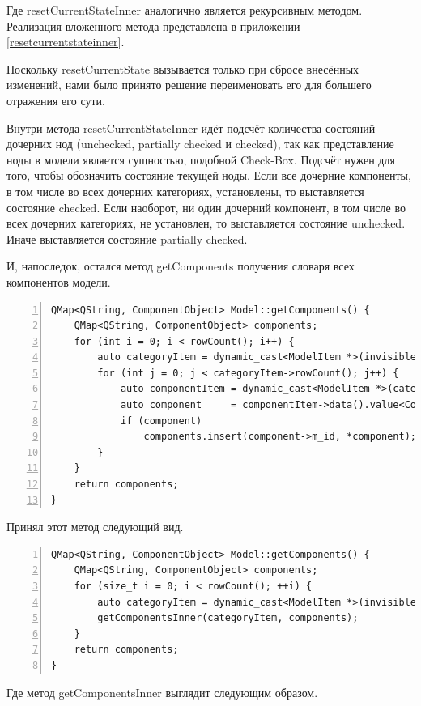 \documentclass[bachelor, och, pract]{SCWorks}
\begin{document}
Где resetCurrentStateInner аналогично является рекурсивным методом.
Реализация вложенного метода представлена в приложении \ref{resetcurrentstateinner}.

Поскольку resetCurrentState вызывается только при сбросе внесённых изменений, нами было принято решение переименовать его для большего отражения его сути.

Внутри метода resetCurrentStateInner идёт подсчёт количества состояний дочерних нод (unchecked, partially checked и checked), так как представление ноды в модели является сущностью, подобной Check-Box.
Подсчёт нужен для того, чтобы обозначить состояние текущей ноды.
Если все дочерние компоненты, в том числе во всех дочерних категориях, установлены, то выставляется состояние checked.
Если наоборот, ни один дочерний компонент, в том числе во всех дочерних категориях, не установлен, то выставляется состояние unchecked.
Иначе выставляется состояние partially checked.

И, напоследок, остался метод getComponents получения словаря всех компонентов модели.

\begin{Verbatim}[fontsize=\small,breaklines=true,numbers=left]
QMap<QString, ComponentObject> Model::getComponents() {
    QMap<QString, ComponentObject> components;
    for (int i = 0; i < rowCount(); i++) {
        auto categoryItem = dynamic_cast<ModelItem *>(invisibleRootItem()->child(i));
        for (int j = 0; j < categoryItem->rowCount(); j++) {
            auto componentItem = dynamic_cast<ModelItem *>(categoryItem->child(j));
            auto component     = componentItem->data().value<ComponentObject *>();
            if (component)
                components.insert(component->m_id, *component);
        }
    }
    return components;
}
\end{Verbatim}

Принял этот метод следующий вид.

\begin{Verbatim}[fontsize=\small,breaklines=true,numbers=left]
QMap<QString, ComponentObject> Model::getComponents() {
    QMap<QString, ComponentObject> components;
    for (size_t i = 0; i < rowCount(); ++i) {
        auto categoryItem = dynamic_cast<ModelItem *>(invisibleRootItem()->child(i));
        getComponentsInner(categoryItem, components);
    }
    return components;
}
\end{Verbatim}

Где метод getComponentsInner выглядит следующим образом.
\end{document}
